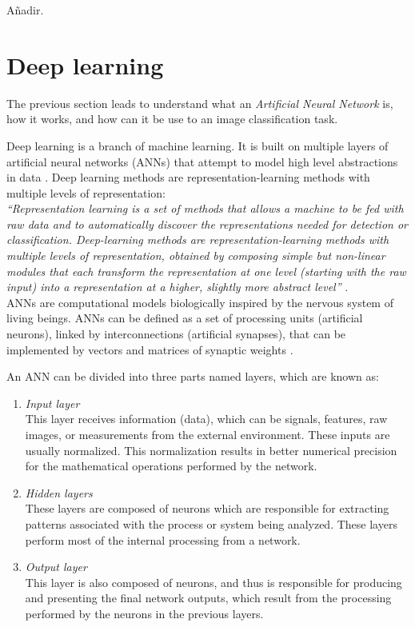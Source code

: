 {\color{JungleGreen} Añadir.}
\citep{Benitez2017}


\section{Deep learning}

The previous section leads to understand what an \textit{Artificial
Neural Network} is, how it works, and how can it be use to an image
classification task.

Deep learning is a branch of machine learning. It is built on multiple
layers of artificial neural networks (ANNs) that attempt to model high
level abstractions in data \citep{Wei2017}. Deep learning methods are
representation-learning methods with multiple levels of representation:\\

\textit{``Representation learning is a set of methods that allows a machine
to be fed with raw data and to automatically discover the representations
needed for detection or classification. Deep-learning methods are
representation-learning methods with multiple levels of representation,
obtained by composing simple but non-linear modules that each transform
the representation at one level (starting with the raw input) into a
representation at a higher, slightly more abstract level''}
\citep{LeCun2015}.\\

ANNs are computational models biologically inspired by the nervous
system of living beings. ANNs can be defined as a set of processing
units (artificial neurons), linked by interconnections (artificial
synapses), that can be implemented by vectors and matrices of synaptic
weights \citep{daSilva2017}.

An ANN can be divided into three parts named layers, which are known as:

\begin{enumerate}[i]
  \item \textit{Input layer}\\
        This layer receives information (data), which can be signals,
        features, raw images, or measurements from the external environment.
        These inputs are usually normalized. This normalization results in
        better numerical precision for the mathematical operations performed
        by the network.
  \item \textit{Hidden layers}\\
        These layers are composed of neurons which are responsible for
        extracting patterns associated with the process or system being
        analyzed. These layers perform most of the internal processing
        from a network.
  \item \textit{Output layer}\\
        This layer is also composed of neurons, and thus is responsible for
        producing and presenting the final network outputs, which result
        from the processing performed by the neurons in the previous layers.
\end{enumerate}

